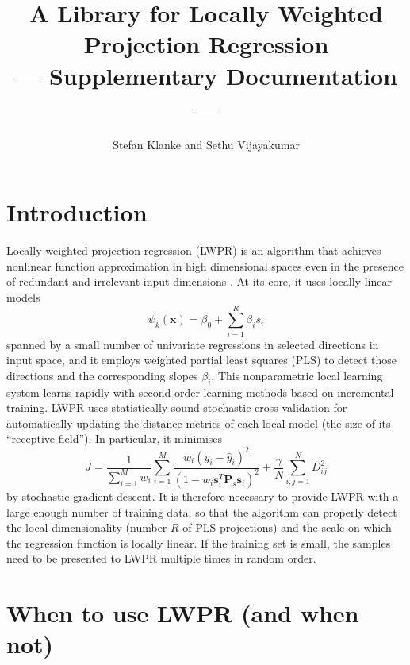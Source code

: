 \documentclass[11pt,a4paper]{article}
\newcommand{\mbf}{\mathbf}
\begin{document}
\title{A Library for Locally Weighted Projection Regression\\
--- Supplementary Documentation ---}

\author{Stefan Klanke and Sethu Vijayakumar}

\parindent=0cm

\maketitle

\tableofcontents

\section{Introduction}

Locally weighted projection regression (LWPR) is an algorithm that 
achieves nonlinear function approximation in high dimensional spaces 
even in the presence of redundant and irrelevant input dimensions
\cite{Vijayakumar2005}. 
At its core, it uses locally linear models
\begin{equation}
\label{eqPLS}
\psi_k(\mbf x)=\beta_0 + \sum_{i=1}^R \beta_i s_i
\end{equation}
spanned by a small number of univariate regressions in selected directions 
in input space, and it employs weighted partial least squares (PLS)
to detect those directions and the corresponding slopes $\beta_i$.
This nonparametric local learning system learns rapidly 
with second order learning methods based on incremental training.
LWPR uses statistically sound stochastic cross validation for 
automatically updating the distance metrics of each local model (the 
size of its ``receptive field''). In particular, it minimises
\begin{equation}
\label{eqDistObj}
J = \frac{1}{\sum_{i=1}^M w_i} 
\sum_{i=1}^M \frac{w_i(y_i - \hat y_i)^2}{(1 - w_i \mbf s_i^T \mbf P_s \mbf s_i)^2}
+ \frac{\gamma}{N} \sum_{i,j=1}^N D^2_{ij}
\end{equation}
by stochastic gradient descent. It is therefore necessary to provide 
LWPR with a large enough number of training data, so that the algorithm
can properly detect the local dimensionality (number $R$ of PLS
projections) and the scale on which the regression function is 
locally linear. If the training set is small, the samples need to
be presented to LWPR multiple times in random order.

\section{When to use LWPR (and when not)}
\end{document}

